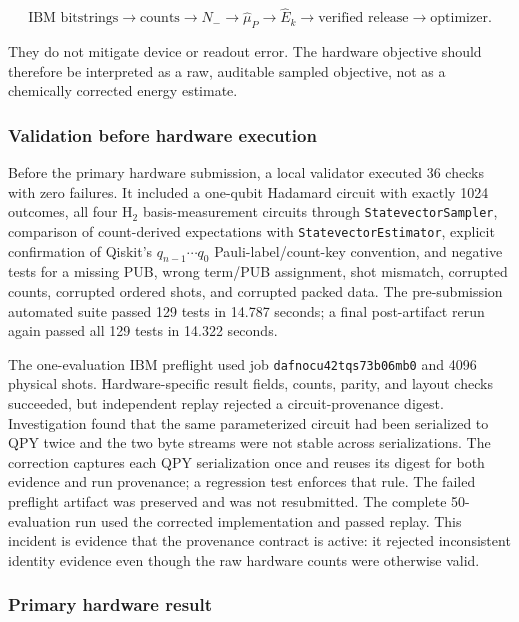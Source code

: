 \begin{equation}
  \text{IBM bitstrings}\to\text{counts}\to N_-
  \to\widehat{\mu}_P\to\widehat{E}_k
  \to\text{verified release}\to\text{optimizer}.
  \label{eq:rv-evidence-chain}
\end{equation}

They do not mitigate device or readout error.  The hardware objective should
therefore be interpreted as a raw, auditable sampled objective, not as a
chemically corrected energy estimate.

\subsubsection{Validation before hardware execution}

Before the primary hardware submission, a local validator executed 36 checks
with zero failures.  It included a one-qubit Hadamard circuit with exactly 1024
outcomes, all four H$_2$ basis-measurement circuits through
\texttt{StatevectorSampler}, comparison of count-derived expectations with
\texttt{StatevectorEstimator}, explicit confirmation of Qiskit's
$q_{n-1}\cdots q_0$ Pauli-label/count-key convention, and negative tests for a
missing PUB, wrong term/PUB assignment, shot mismatch, corrupted counts,
corrupted ordered shots, and corrupted packed data.  The pre-submission
automated suite passed 129 tests in 14.787 seconds; a final post-artifact rerun
again passed all 129 tests in 14.322 seconds.

The one-evaluation IBM preflight used job
\texttt{dafnocu42tqs73b06mb0} and 4096 physical shots.  Hardware-specific
result fields, counts, parity, and layout checks succeeded, but independent
replay rejected a circuit-provenance digest.  Investigation found that the same
parameterized circuit had been serialized to QPY twice and the two byte streams
were not stable across serializations.  The correction captures each QPY
serialization once and reuses its digest for both evidence and run provenance;
a regression test enforces that rule.  The failed preflight artifact was
preserved and was not resubmitted.  The complete 50-evaluation run used the
corrected implementation and passed replay.  This incident is evidence that
the provenance contract is active: it rejected inconsistent identity evidence
even though the raw hardware counts were otherwise valid.

\subsubsection{Primary hardware result}

